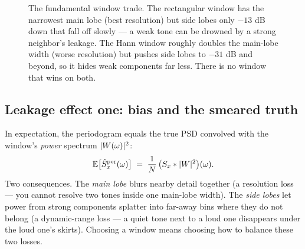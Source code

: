 \begin{figure}[H]
\centering
{}
\caption{The fundamental window trade. The rectangular window has the narrowest
main lobe (best resolution) but side lobes only $-13$ dB down that fall off slowly
--- a weak tone can be drowned by a strong neighbor's leakage. The Hann window
roughly doubles the main-lobe width (worse resolution) but pushes side lobes to
$-31$ dB and beyond, so it hides weak components far less. There is no window that
wins on both.}
\label{ch21:fig-windows}
\end{figure}

\subsection{Leakage effect one: bias and the smeared truth}

In expectation, the periodogram equals the true PSD convolved with
the window's \emph{power} spectrum $\lvert W(\omega)\rvert^2$:
\[
\operatorname{\mathbb{E}}\!\big[\hat{S}^{\text{per}}_x(\omega)\big] \;=\; \frac{1}{N}\,\big(S_x \ast \lvert W\rvert^2\big)(\omega).
\]
Two consequences. The \emph{main lobe} blurs nearby detail together (a resolution
loss --- you cannot resolve two tones inside one main-lobe width). The \emph{side
lobes} let power from strong components splatter into far-away bins where they do
not belong (a dynamic-range loss --- a quiet tone next to a loud one disappears
under the loud one's skirts). Choosing a window means choosing how to balance these
two losses.

